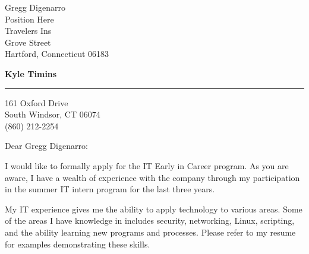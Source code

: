 \documentclass{letter} %
\begin{document}
\signature{Kyle Timins}           		   %
\longindentation=0pt                       %
\let\raggedleft\raggedright                %
 
 
\begin{letter}{Gregg Digenarro \\
Position Here \\
Travelers Ins \\
Grove Street \\
Hartford, Connecticut 06183}

\begin{center}
{\large\bf Kyle Timins} 
\end{center}
\medskip\hrule height 1pt
\begin{center}
{161 Oxford Drive \\   South Windsor, CT 06074 \\ (860) 212-2254} 
\end{center} \vspace{2 cm} %
 
 
\opening{Dear Gregg Digenarro:} 

\noindent I would like to formally apply for the IT Early in Career
program. As you are aware, I have a wealth of experience with the 
company through my participation in the summer IT intern program 
for the last three years.
 

\noindent My IT experience gives me the ability to apply technology 
to various areas. Some of the areas I have knowledge in includes 
security, networking, Linux, scripting, and the ability learning new 
programs and processes. Please refer to my resume for examples 
demonstrating these skills.
 

\end{letter}
\end{document}
